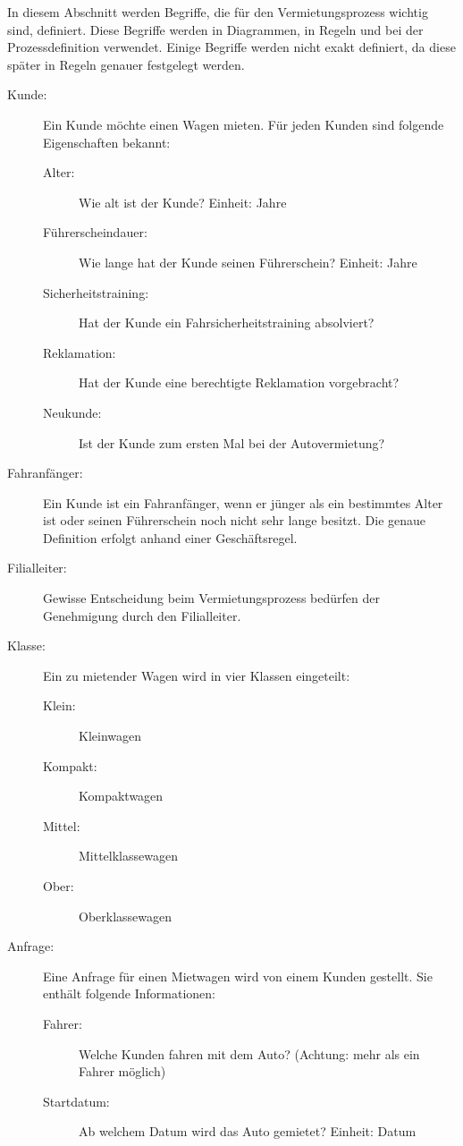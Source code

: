 In diesem Abschnitt werden Begriffe, die für den Vermietungsprozess wichtig sind, definiert.
Diese Begriffe werden in Diagrammen, in Regeln und bei der Prozessdefinition verwendet.
Einige Begriffe werden nicht exakt definiert, da diese später in Regeln genauer
festgelegt werden.

\begin{description}
	\item[Kunde:] Ein Kunde möchte einen Wagen mieten. Für jeden Kunden sind folgende Eigenschaften bekannt:
		\begin{description}
			\item[Alter:] Wie alt ist der Kunde? Einheit: Jahre
			\item[Führerscheindauer:] Wie lange hat der Kunde seinen Führerschein? Einheit: Jahre
			\item[Sicherheitstraining:] Hat der Kunde ein Fahrsicherheitstraining absolviert?
			\item[Reklamation:] Hat der Kunde eine berechtigte Reklamation vorgebracht?
			\item[Neukunde:] Ist der Kunde zum ersten Mal bei der Autovermietung?
		\end{description}
	\item[Fahranfänger:] Ein Kunde ist ein Fahranfänger, wenn er jünger als ein bestimmtes Alter ist oder
		seinen Führerschein noch nicht sehr lange besitzt. Die genaue Definition erfolgt anhand einer
		Geschäftsregel.	
	\item[Filialleiter:] Gewisse Entscheidung beim Vermietungsprozess bedürfen der Genehmigung durch
		den Filialleiter.
	\item[Klasse:] Ein zu mietender Wagen wird in vier Klassen eingeteilt:
		\begin{description}
			\item[Klein:] Kleinwagen
			\item[Kompakt:] Kompaktwagen
			\item[Mittel:] Mittelklassewagen
			\item[Ober:] Oberklassewagen
		\end{description}
	\item[Anfrage:] Eine Anfrage für einen Mietwagen wird von einem Kunden gestellt. Sie enthält folgende Informationen:
		\begin{description}
			\item[Fahrer:] Welche Kunden fahren mit dem Auto? (Achtung: mehr als ein Fahrer möglich)
			\item[Startdatum:] Ab welchem Datum wird das Auto gemietet? Einheit: Datum

\end{description}
\end{description}
